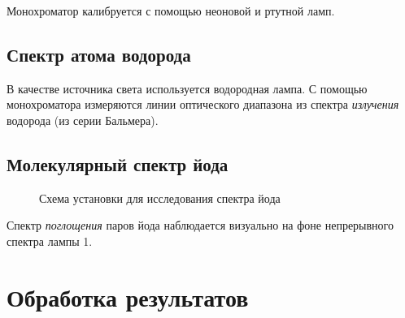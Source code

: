 \documentclass[a4paper,12pt]{article}
\begin{document}
	Монохроматор калибруется с помощью неоновой и ртутной ламп.
	
	\subsection{Спектр атома водорода}
	
	В качестве источника света используется водородная лампа. С помощью монохроматора измеряются линии оптического диапазона из спектра \textit{излучения} водорода (из серии Бальмера).
	
	\newpage
	
	\subsection{Молекулярный спектр йода}
	
	\begin{figure}[ht!]\label{ischeme} 
		\caption{Схема установки для исследования спектра йода}
	\end{figure}
	
	Спектр \textit{поглощения} паров йода наблюдается визуально на фоне непрерывного спектра лампы 1.
	
	\section{Обработка результатов}
	
\end{document}
